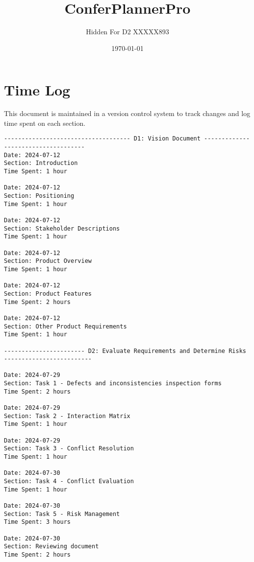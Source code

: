 \documentclass{article}
\begin{document}
\title{ConferPlannerPro}
\author{Hidden For D2 XXXXX893}
\date{\today}
\maketitle

\section{Time Log}
This document is maintained in a version control system to track changes and log time spent on each section.
\begin{verbatim}
------------------------------------ D1: Vision Document ------------------------------------
Date: 2024-07-12
Section: Introduction
Time Spent: 1 hour

Date: 2024-07-12
Section: Positioning
Time Spent: 1 hour

Date: 2024-07-12
Section: Stakeholder Descriptions
Time Spent: 1 hour

Date: 2024-07-12
Section: Product Overview
Time Spent: 1 hour

Date: 2024-07-12
Section: Product Features
Time Spent: 2 hours

Date: 2024-07-12
Section: Other Product Requirements
Time Spent: 1 hour

----------------------- D2: Evaluate Requirements and Determine Risks -------------------------

Date: 2024-07-29
Section: Task 1 - Defects and inconsistencies inspection forms
Time Spent: 2 hours

Date: 2024-07-29
Section: Task 2 - Interaction Matrix
Time Spent: 1 hour

Date: 2024-07-29
Section: Task 3 - Conflict Resolution
Time Spent: 1 hour

Date: 2024-07-30
Section: Task 4 - Conflict Evaluation
Time Spent: 1 hour

Date: 2024-07-30
Section: Task 5 - Risk Management
Time Spent: 3 hours

Date: 2024-07-30
Section: Reviewing document
Time Spent: 2 hours

\end{verbatim}
\end{document}

